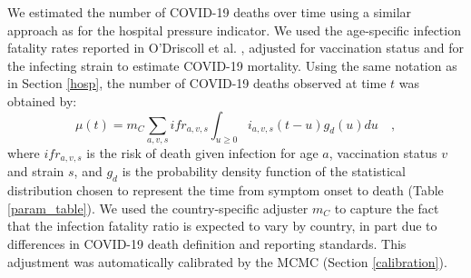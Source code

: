 We estimated the number of COVID-19 deaths over time using a similar approach 
as for the hospital pressure indicator. We used the age-specific infection fatality rates reported in
O'Driscoll et al. \cite{odriscoll2021}, adjusted for vaccination status and for the infecting strain
to estimate COVID-19 mortality. Using the same notation as in Section \ref{hosp}, the number of COVID-19
deaths observed at time $t$ was obtained by:
\begin{equation}
\mu(t) = m_C \sum_{a,v,s} ifr_{a,v,s} \int_{u \geq 0}  i_{a,v,s}(t-u)g_{d}(u) du   \quad,
\end{equation}
where $ifr_{a,v,s}$ is the risk of death given infection for age $a$, vaccination status $v$ and strain $s$, 
and $g_d$ is the probability density function of the statistical distribution chosen to represent the 
time from symptom onset to death (Table \ref{param_table}). We used the country-specific adjuster $m_C$ to 
capture the fact that the infection fatality ratio is expected to vary by country, in part due to 
differences in COVID-19 death definition and reporting standards. This adjustment was automatically calibrated 
by the MCMC (Section \ref{calibration}).